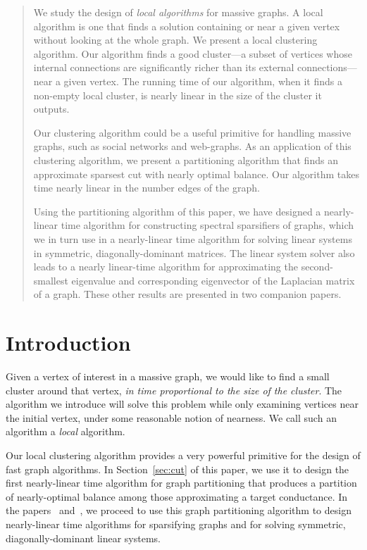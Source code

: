 \documentclass[11pt]{article}
\begin{document}
\begin{abstract}
We study the design of {\em local algorithms} for 
  massive graphs.
A local algorithm is one that
  finds a solution containing or near a given vertex without
  looking at the whole graph.
We present a local clustering algorithm.
Our algorithm finds a good cluster---a subset of vertices
  whose internal connections are significantly richer
  than its external connections---near a given vertex.
The running time of our algorithm, when it finds a non-empty
  local cluster, is nearly linear in the size
  of the cluster it outputs.

Our clustering algorithm could be  a useful primitive
  for handling massive graphs, such as social networks and web-graphs.
As an application of this clustering algorithm,
  we present a partitioning algorithm
  that finds an approximate sparsest cut with nearly optimal balance.
Our algorithm takes time nearly linear in the number edges of the graph.

Using the partitioning algorithm of this paper, we have designed a nearly-linear
  time algorithm for constructing spectral sparsifiers of graphs, which
  we in turn use in a nearly-linear time algorithm for solving linear
  systems in symmetric, diagonally-dominant matrices.
The linear system solver also leads to a nearly linear-time
  algorithm for approximating 
  the second-smallest eigenvalue and corresponding eigenvector
  of the Laplacian matrix of a graph.
These other results are presented in two companion papers.
\end{abstract}

\newpage
\section{Introduction}\label{sec:Intro}

Given a vertex of interest in a massive graph, we
  would like to find a small cluster around that vertex, 
  \textit{in time proportional to the size of the cluster}.
The algorithm we introduce will solve this problem while
  only examining vertices near the initial
  vertex, under some reasonable notion of nearness.
We call such an algorithm a \textit{local} algorithm.

Our local clustering algorithm provides a very powerful
  primitive for the design of fast graph algorithms.
In Section~\ref{sec:cut} of this paper, we use it to design
  the first nearly-linear time algorithm for graph partitioning
  that produces a partition of nearly-optimal balance among those
  approximating a target conductance.
In the papers~\cite{SpielmanTengSparsifier} and~\cite{SpielmanTengLinsolve},
  we proceed to use this graph partitioning algorithm to design
  nearly-linear time algorithms for sparsifying graphs and for solving
  symmetric, diagonally-dominant linear systems.
\end{document}
